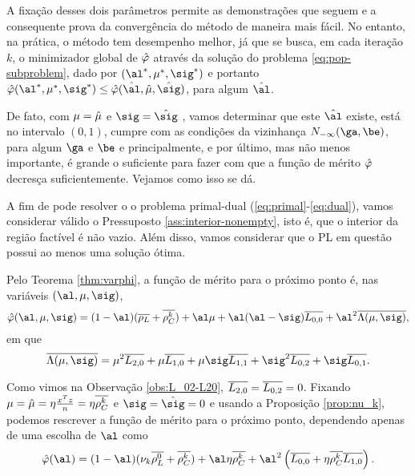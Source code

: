  A fixação desses dois parâmetros permite as demonstrações que seguem e a consequente prova da convergência do método de maneira mais fácil. No entanto, na prática, o método  tem desempenho melhor, já que se busca, em cada iteração $k$,
o minimizador global de $\hat{\varphi}$ através da solução do problema \eqref{eq:pop-subproblem}, dado por $(\al^*,\mu^*,\sig^*)$ e portanto	$\nextphi(\al^*,\mu^*,\sig^*)\leq \nextphi(\hat{\al},\nextmu,\nextsig)$, para algum   $\hat{\al}$.

De fato, com $\mu=\hat{\mu}$ e $\sig=\nextsig$ , vamos determinar que este $\nextal$ existe, está no intervalo $(0,1)$, cumpre com as condições da vizinhança $N_{-\infty}(\ga,\be)$, para algum $\ga$ e $\be$  e principalmente, e por último, mas não menos importante, é grande o suficiente para fazer com que a função de mérito $\hat{\varphi}$ decresça suficientemente. Vejamos como isso se dá.




A fim de pode  resolver o o problema primal-dual (\ref{eq:primal}-\ref{eq:dual}), vamos considerar válido o Pressuposto \ref{ass:interior-nonempty}, isto é, que o interior da região factível é não vazio. Além disso, vamos considerar que o \ac{PL} em questão possui ao menos uma solução ótima. 





Pelo Teorema \ref{thm:varphi}, a função de mérito para o próximo ponto   é, nas variáveis  $(\al,\mu,\sig)$,
\begin{equation*}
{\nextphi}(\al,\mu,\sig) =  (1-\al)(\dbvec{\rho_L} +
\rhoCkb ) + \al\mu + \al(\al-\sig)\dbvec{L_{0,0}} +
\al^2\dbvec{\Lambda(\mu,\sig)} ,
\end{equation*}
em que 
\[
\dbvec{\Lambda(\mu,\sig)} = \mu^2
 \dbvec{L_{2,0}} + \mu \dbvec{L_{1,0}} + 	\mu \sig \dbvec{L_{1,1}} +
 \sig^2 \dbvec{L_{0,2}} + \sig \dbvec{L_{0,1}}.
 \]


Como vimos na Observação \ref{obs:L_02-L20},  $\overline{L_{2,0}} = \overline{L_{0,2}} = 0$. Fixando $\mu = \hat{\mu} = \eta\frac{x^Tz}{n} = \eta\overline{\rho_C^{k}}  $
 e $\sig = \nextsig=0$ e usando a Proposição \ref{prop:nu_k},   podemos rescrever a função de mérito para o próximo ponto, dependendo apenas de uma escolha de  $\al$ como
\begin{equation}
	\label{eq:simplified-merit-function-al}
\nextphi(\al)  = (1-\al)(\nuk \dbvec{\rho_L^{0}} +
\rhoCkb ) + \al\eta\rhoCkb  + \al^2\left(\dbvec{L_{0,0}} + \eta\rhoCkb  \dbvec{L_{1,0}}
\right) .
\end{equation}


